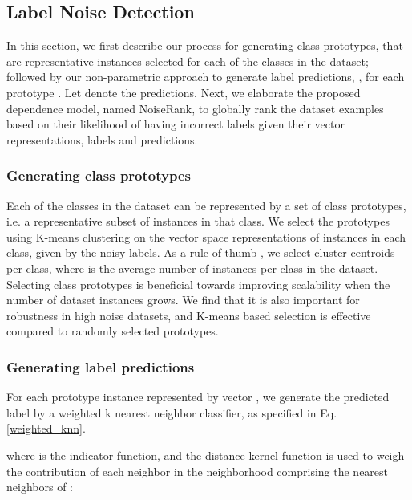 \subsection {Label Noise Detection}



In this section, we first describe our process for generating class prototypes, that are representative instances selected for each of the  classes in the dataset; followed by our non-parametric approach to generate label predictions, , for each prototype . Let  denote the predictions. Next, we elaborate the proposed dependence model, named NoiseRank, to globally rank the dataset examples based on their likelihood of having incorrect labels given their vector representations, labels and predictions. 





\subsubsection {Generating class prototypes} 
\label{sec:class_prototypes} Each of the  classes in the dataset can be represented by a set of class prototypes, i.e. a representative subset of instances in that class. We select the prototypes using K-means clustering on the vector space representations of instances in each class, given by the noisy labels. As a rule of thumb \cite{kodinariya2013review}, we select  cluster centroids per class, where  is the average number of instances per class in the dataset. Selecting class prototypes is beneficial towards improving scalability when the number of dataset instances grows.
We find that it is also important for robustness in high noise datasets, and K-means based selection is effective compared to randomly selected prototypes.

\subsubsection {Generating label predictions} 
\label{sec:label_pred} For each prototype instance  represented by vector , we generate the predicted label   by a weighted k nearest neighbor classifier, as specified in Eq. \ref{weighted_knn}.



where  is the indicator function, and the distance kernel function  is used to weigh the contribution of each neighbor  in the neighborhood  comprising the  nearest neighbors of :  


